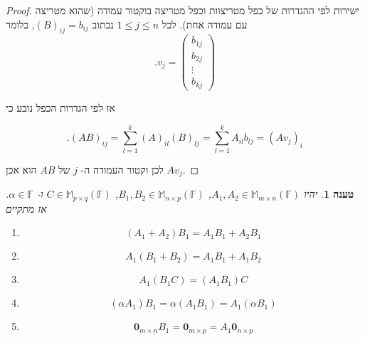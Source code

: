 \documentclass[12pt]{report}
\theoremstyle{plain}
\newtheorem{proposition}[theorem]{טענה}
\theoremstyle{definition}
\newcommand{\F}{\mathbb{F}}
\newcommand{\M}{\mathbb{M}}
\newcommand{\0}{\mathbf{0}}
\begin{document}
\begin{proof}
ישירות לפי ההגדרות של כפל מטריצוות וכפל מטריצה בוקטור עמודה (שהוא מטריצה עם עמודה אחת). 
לכל
$1\leq j\leq n$
נכתוב
$(B)_{ij}=b_{ij}$, 
כלומר
$$
.v_j=\begin{pmatrix}b_{1j} \\ b_{2j} \\ \vdots \\ b_{kj}\end{pmatrix}
$$

אז לפי הגדרות הכפל נובע כי

$$
.(AB)_{ij}=\sum_{l=1}^k (A)_{il}(B)_{lj}=\sum_{l=1}^k A_{il}b_{lj}=(Av_j)_i
$$

לכן וקטור העמודה ה-
$j$
של
$AB$
הוא אכן
$Av_j$.
\end{proof}

\begin{proposition}\label{prop:matrix-multiplication}
יהיו
$A_1,A_2\in\M_{m\times n}(\F)$,
$B_1,B_2\in\M_{n\times p}(\F)$,
$C\in\M_{p\times q}(\F)$
ו-
$\alpha\in\F$.
אז מתקיים

\begin{enumerate}[label=\alph*.]
\item 
$$
(A_1+A_2)B_1=A_1B_1+A_2B_1
$$


\item 
$$
A_1(B_1+B_2)=A_1B_1+A_1B_2
$$


\item 
$$
A_1(B_1C)=(A_1B_1)C
$$


\item 
$$
(\alpha A_1)B_1=\alpha(A_1B_1)=A_1(\alpha B_1)
$$


\item 
$$
\0_{m\times n} B_1=\0_{m\times p}=A_1\0_{n\times p}
$$


\end{enumerate}
\end{proposition}
\end{document}
